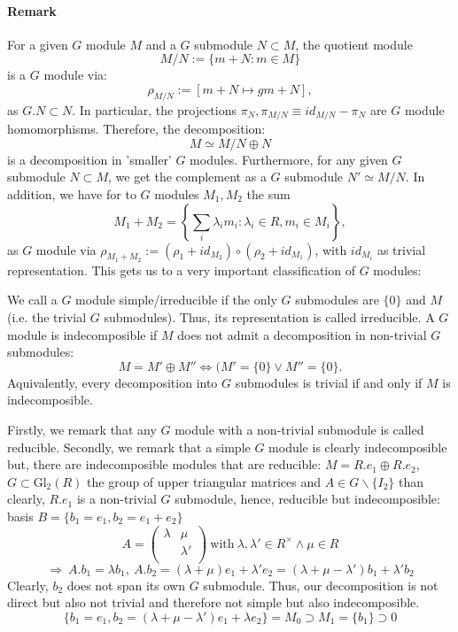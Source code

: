 \paragraph{Remark}
For a given $G$ module $M$ and a $G$ submodule $N \subset M$, the quotient module
$$M/N := \{m + N : m \in M\}$$
is a $G$ module via:
$$\rho_{M/N} := \left[m + N \longmapsto g m + N\right],$$
as $G. N \subset N$. In particular, the projections $\pi_N, \pi_{M/N} \equiv id_{M/N} - \pi_N$ are $G$ module homomorphisms. Therefore, the decomposition:
$$M \simeq M/N \oplus N$$
is a decomposition in 'smaller' $G$ modules. Furthermore, for any given $G$ submodule $N \subset M$, we get the complement as a $G$ submodule $N' \simeq M/N$. In addition, we have for to $G$ modules $M_1, M_2$ the sum 
$$M_1 + M_2 = \left\{\sum_i \lambda_i m_i : \lambda_i \in R, m_i \in M_i\right\},$$
as $G$ module via $\rho_{M_1 + M_2} := (\rho_1 + id_{M_2}) \circ (\rho_2 + id_{M_1})$, with $id_{M_i}$ as trivial representation. This gets us to a very important classification of $G$ modules:
\begin{defi}
We call a $G$ module simple/irreducible if the only $G$ submodules are $\{0\}$ and $M$ (i.e. the trivial $G$ submodules). Thus, its representation is called irreducible. A $G$ module is indecomposible if $M$ does not admit a decomposition in non-trivial $G$ submodules:
$$M = M' \oplus M'' \Leftrightarrow (M' = \{0\} \vee M'' = \{0\}.$$
Aquivalently, every decomposition into $G$ submodules is trivial if and only if $M$ is indecomposible.
\end{defi}
Firstly, we remark that any $G$ module with a non-trivial submodule is called reducible. Secondly, we remark that a simple $G$ module is clearly indecomposible but, there are indecomposible modules that are reducible: $M = R.e_1 \oplus R.e_2$, $G \subset \mathrm{Gl}_2(R)$ the group of upper triangular matrices and $A \in G \backslash \{I_2\}$ than clearly, $R.e_1$ is a non-trivial $G$ submodule, hence, reducible but indecomposible: basis $B = \{b_1 = e_1, b_2 = e_1 + e_2\}$
$$A = \left(\begin{array}{cc}\lambda & \mu\\ &\lambda'\\\end{array}\right)\ \mathrm{with}\ \lambda, \lambda' \in R^\times \wedge \mu \in R$$$$ \Rightarrow\ A.b_1 = \lambda b_1,\ A.b_2 = (\lambda + \mu) e_1 + \lambda' e_2 = (\lambda + \mu - \lambda' ) b_1 + \lambda' b_2$$
Clearly, $b_2$ does not span its own $G$ submodule. Thus, our decomposition is not direct but also not trivial and therefore not simple but also indecomposible.
$$\{b_1 = e_1, b_2 = (\lambda + \mu - \lambda') e_1 + \lambda e_2\} = M_0 \supset M_1 = \{b_1\} \supset 0$$
